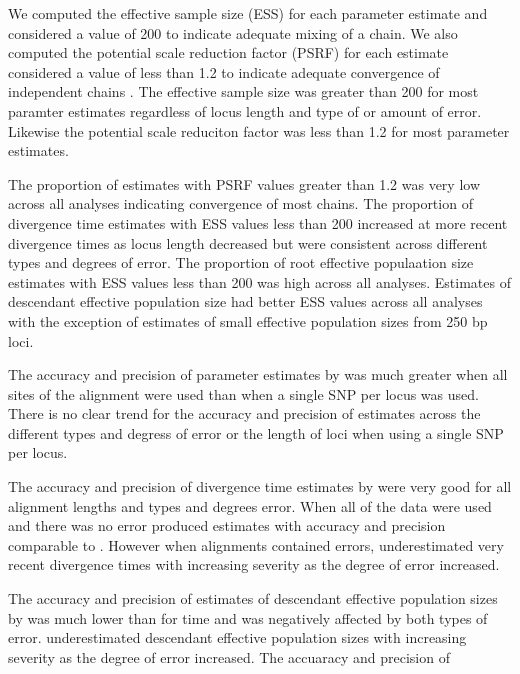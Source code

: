 We computed the effective sample size (ESS) for each parameter estimate and considered
a value of 200 to indicate adequate mixing of a chain. 
We also computed the potential scale reduction factor (PSRF) for each estimate 
considered a value of less than 1.2 to indicate adequate convergence of 
independent chains \citep{gelman1998}. 
The effective sample size was greater than 200 for most \ecoevolity paramter
estimates regardless of locus length and type of or amount of error. 
Likewise the potential scale reduciton factor was less than 1.2 for most \ecoevolity parameter estimates.

The proportion of estimates with PSRF values greater than 1.2 was very low across 
all \beast analyses indicating convergence of most chains.
The proportion of \beast divergence time estimates with ESS values less than 200 
increased at more recent divergence times as locus length decreased but were 
consistent across different types and degrees of error.
The proportion of \beast root effective populaation size estimates with ESS 
values less than 200 was high across all analyses. 
Estimates of descendant effective population size had better ESS values across all 
analyses with the exception of estimates of small effective population sizes from 
250 bp loci.

The accuracy and precision of parameter estimates by \ecoevolity was much greater
when all sites of the alignment were used than when a single SNP per locus was used.  
There is no clear trend for the accuracy and precision of \ecoevolity estimates across the
different types and degress of error or the length of loci when using a single SNP per locus. 

The accuracy and precision of divergence time estimates by \beast were very good for all 
alignment lengths and types and degrees error. 
When all of the data were used and there was no error \ecoevolity produced 
estimates with accuracy and precision comparable to \beast. 
However when alignments contained errors, \ecoevolity underestimated very recent 
divergence times with increasing severity as the degree of error increased. 


The accuracy and precision of estimates of descendant effective population sizes 
by \beast was much lower than for time and was negatively affected by both types
of error. 
\beast underestimated descendant effective population sizes with increasing severity 
as the degree of error increased.
The accuaracy and precision of  






